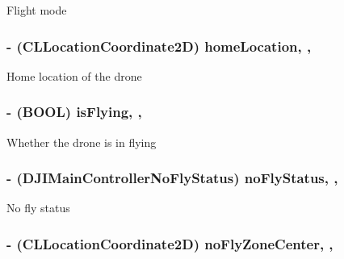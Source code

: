 Flight mode \hypertarget{interface_d_j_i_m_c_system_state_a4395f4e24d0f084407cf99fdf4d630b2}{
\subsubsection[{home\+Location}]{\setlength{\rightskip}{0pt plus 5cm}-\/ (C\+L\+Location\+Coordinate2\+D) home\+Location\hspace{0.3cm}{\ttfamily [read]}, {\ttfamily [nonatomic]}, {\ttfamily [assign]}}}\label{interface_d_j_i_m_c_system_state_a4395f4e24d0f084407cf99fdf4d630b2}
Home location of the drone \hypertarget{interface_d_j_i_m_c_system_state_a7d0f82dcfa7ba2650c394815a0ce9e06}{
\subsubsection[{is\+Flying}]{\setlength{\rightskip}{0pt plus 5cm}-\/ (B\+O\+O\+L) is\+Flying\hspace{0.3cm}{\ttfamily [read]}, {\ttfamily [nonatomic]}, {\ttfamily [assign]}}}\label{interface_d_j_i_m_c_system_state_a7d0f82dcfa7ba2650c394815a0ce9e06}
Whether the drone is in flying \hypertarget{interface_d_j_i_m_c_system_state_ab1d284a6e00a0fed3c262e69d3b738ab}{
\subsubsection[{no\+Fly\+Status}]{\setlength{\rightskip}{0pt plus 5cm}-\/ (D\+J\+I\+Main\+Controller\+No\+Fly\+Status) no\+Fly\+Status\hspace{0.3cm}{\ttfamily [read]}, {\ttfamily [nonatomic]}, {\ttfamily [assign]}}}\label{interface_d_j_i_m_c_system_state_ab1d284a6e00a0fed3c262e69d3b738ab}
No fly status \hypertarget{interface_d_j_i_m_c_system_state_a1840e97a45fe5f712af878e9aec09e0d}{
\subsubsection[{no\+Fly\+Zone\+Center}]{\setlength{\rightskip}{0pt plus 5cm}-\/ (C\+L\+Location\+Coordinate2\+D) no\+Fly\+Zone\+Center\hspace{0.3cm}{\ttfamily [read]}, {\ttfamily [nonatomic]}, {\ttfamily [assign]}}}\label{interface_d_j_i_m_c_system_state_a1840e97a45fe5f712af878e9aec09e0d}
